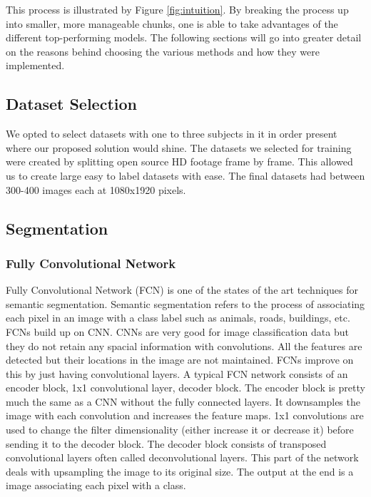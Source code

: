 This process is illustrated by Figure \ref{fig:intuition}. By breaking the process up into smaller, more manageable chunks, one is able to take advantages of the different top-performing models. The following sections will go into greater detail on the reasons behind choosing the various methods and how they were implemented.

\subsection{Dataset Selection}

We opted to select datasets with one to three subjects in it in order present
where our proposed solution would shine. The datasets we selected for training
were created by splitting open source HD footage frame by frame. This allowed us
to create large easy to label datasets with ease. The final datasets had between 
300-400 images each at 1080x1920 pixels. 



\subsection{Segmentation}
\subsubsection*{Fully Convolutional Network}

Fully Convolutional Network (FCN) is one of the states of the art techniques for
semantic segmentation. Semantic segmentation \cite{Liu2018} refers to the process of
associating each pixel in an image with a class label such as animals, roads,
buildings, etc. FCNs build up on CNN. CNNs are very good for image
classification data but they do not retain any spacial information with
convolutions. All the features are detected but their locations in the image are
not maintained. FCNs improve on this by just having convolutional layers. A
typical FCN network consists of an encoder block, 1x1 convolutional layer,
decoder block. The encoder block is pretty much the same as a CNN without the
fully connected layers. It downsamples the image with each convolution and
increases the feature maps. 1x1 convolutions are used to change the filter
dimensionality (either increase it or decrease it) before sending it to the
decoder block. The decoder block consists of transposed convolutional layers
often called deconvolutional layers. This part of the network deals with
upsampling the image to its original size. The output at the end is a image
associating each pixel with a class.


